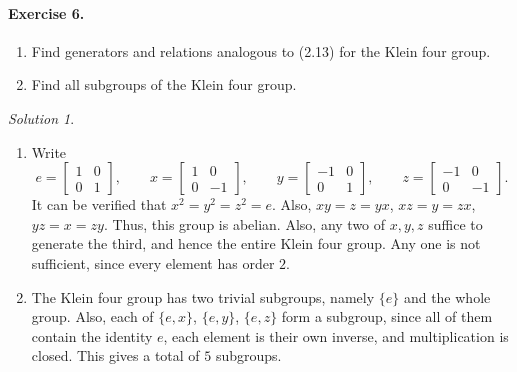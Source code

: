 \documentclass[11pt]{report}
\theoremstyle{remark}
\newtheorem*{solution}{Solution}
\begin{document}
    \paragraph{Exercise 6.} \mbox{}
    \begin{enumerate}
        \itemsep0em
        \item Find generators and relations analogous to (2.13) for the Klein four
        group.
        \item Find all subgroups of the Klein four group.
    \end{enumerate}
    \begin{solution} \mbox{}
        \begin{enumerate}
            \item Write \[
                e = \begin{bmatrix}
                    1 & 0 \\ 0 & 1
                \end{bmatrix}, \qquad
                x = \begin{bmatrix}
                    1 & 0 \\ 0 & -1
                \end{bmatrix}, \qquad
                y = \begin{bmatrix}
                    -1 & 0 \\ 0 & 1
                \end{bmatrix}, \qquad
                z = \begin{bmatrix}
                    -1 & 0 \\ 0 & -1
                \end{bmatrix}.
            \] It can be verified that $x^2 = y^2 = z^2 = e$. Also, $xy = z = yx$,
            $xz = y = zx$, $yz = x = zy$. Thus, this group is abelian. Also, any
            two of $x, y, z$ suffice to generate the third, and hence the entire
            Klein four group. Any one is not sufficient, since every element has
            order $2$.

            \item The Klein four group has two trivial subgroups, namely $\{e\}$ and
            the whole group. Also, each of $\{e, x\}$, $\{e, y\}$, $\{e, z\}$ form a
            subgroup, since all of them contain the identity $e$, each element is
            their own inverse, and multiplication is closed. This gives a total of
            $5$ subgroups.
        \end{enumerate}
    \end{solution}
\end{document}
